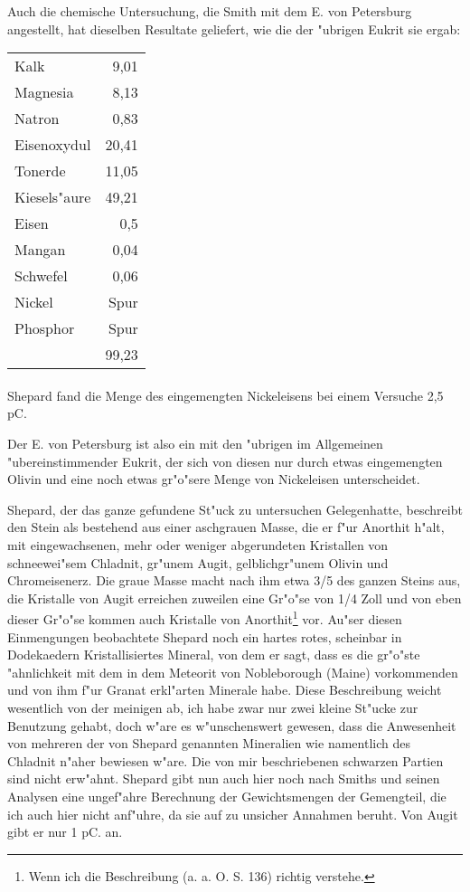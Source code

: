 \documentclass[a4paper, 11pt, oneside, german]{article}
\begin{document}
Auch die chemische Untersuchung, die Smith mit dem E. von Petersburg angestellt, hat dieselben Resultate geliefert, wie die der "ubrigen Eukrit sie ergab:
\begin{center}
\begin{tabular}{ l r }
    Kalk & 9,01\\
    Magnesia & 8,13\\
    Natron & 0,83\\
    Eisenoxydul & 20,41\\
    Tonerde & 11,05\\
    Kiesels"aure & 49,21\\
    Eisen & 0,5\\
    Mangan & 0,04\\
    Schwefel & 0,06\\
    Nickel & Spur\\
    Phosphor & Spur\\
     & 99,23\\
\end{tabular}
\end{center}
\paragraph{}
Shepard fand die Menge des eingemengten Nickeleisens bei einem Versuche 2,5 pC.

Der E. von Petersburg ist also ein mit den "ubrigen im Allgemeinen "ubereinstimmender Eukrit, der sich von diesen nur durch etwas eingemengten Olivin und eine noch etwas gr"o"sere Menge von Nickeleisen unterscheidet.

Shepard, der das ganze gefundene St"uck zu untersuchen Gelegenhatte, beschreibt den Stein als bestehend aus einer aschgrauen Masse, die er f"ur Anorthit h"alt, mit eingewachsenen, mehr oder weniger abgerundeten Kristallen von schneewei"sem Chladnit, gr"unem Augit, gelblichgr"unem Olivin und Chromeisenerz. Die graue Masse macht nach ihm etwa 3/5 des ganzen Steins aus, die Kristalle von Augit erreichen zuweilen eine Gr"o"se von 1/4 Zoll und von eben dieser Gr"o"se kommen auch Kristalle von Anorthit\footnote{Wenn ich die Beschreibung (a. a. O. S. 136) richtig verstehe.} vor. Au"ser diesen Einmengungen beobachtete Shepard noch ein hartes rotes, scheinbar in Dodekaedern Kristallisiertes Mineral, von dem er sagt, dass es die gr"o"ste "ahnlichkeit mit dem in dem Meteorit von Nobleborough (Maine) vorkommenden und von ihm f"ur Granat erkl"arten Minerale habe. Diese Beschreibung weicht wesentlich von der meinigen ab, ich habe zwar nur zwei kleine St"ucke zur Benutzung gehabt, doch w"are es w"unschenswert gewesen, dass die Anwesenheit von mehreren der von Shepard genannten Mineralien wie namentlich des Chladnit n"aher bewiesen w"are. Die von mir beschriebenen schwarzen Partien sind nicht erw"ahnt. Shepard gibt nun auch hier noch nach Smiths und seinen Analysen eine ungef"ahre Berechnung der Gewichtsmengen der Gemengteil, die ich auch hier nicht anf"uhre, da sie auf zu unsicher Annahmen beruht. Von Augit gibt er nur 1 pC. an.
\end{document}
